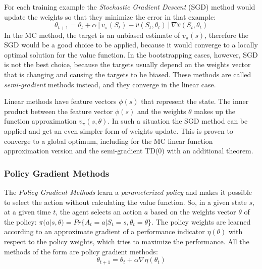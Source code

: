 For each training example the \textit{Stochastic Gradient Descent} (SGD) method would update the weights so that they minimize the error in that example:
\begin{equation}\label{SGD}
\theta_{t+1}=\theta_{t}+\alpha \left [ v_{\pi}(S_{t}) - \hat{v}(S_{t},\theta_{t}) \right ]\nabla\hat{v}(S_{t},\theta_{t})
\end{equation}
In the MC method, the target is an unbiased estimate of $v_{\pi}(s)$, therefore the SGD would be a good choice to be applied, because it would converge to a locally optimal solution for the value function. In the bootstrapping cases, however, SGD is not the best choice, because the targets usually depend on the weights vector that is changing and causing the targets to be biased. These methods are called \textit{semi-gradient} methods instead, and they converge in the linear case.

Linear methods have feature vectors $\phi(s)$ that represent the state. The inner product between the feature vector $\phi(s)$ and the weights $\theta$ makes up the function approximation $v_{\pi}(s,\theta)$. In such a situation the SGD method can be applied and get an even simpler form of weights update. This is proven to converge to a global optimum, including for the MC linear function approximation version and the semi-gradient TD(0) with an additional theorem.

\subsubsection{Policy Gradient Methods} \label{PolicyGradMeths}
The \textit{Policy Gradient Methods} learn a \textit{parameterized policy} and makes it possible to select the action without calculating the value function. So, in a given state $s$, at a given time $t$, the agent selects an action $a$ based on the weights vector ${\theta}$ of the policy: ${\pi}(a|s,{\theta})=Pr\{A_{t}=a|S_{t}=s,{\theta}_{t}={\theta}\}$. The policy weights are learned according to an approximate gradient of a performance indicator ${\eta}({\theta})$ with respect to the policy weights, which tries to maximize the performance. All the methods of the form  are policy gradient methods:
\begin{equation}\label{gradM}
\theta_{t+1}=\theta_{t}+\alpha \nabla \eta (\theta_{t})
\end{equation}

